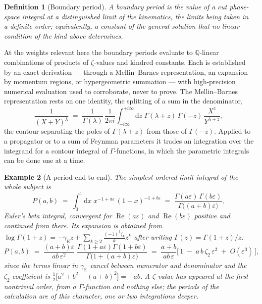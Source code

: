 \documentclass[11pt]{article}
\newcommand{\eps}{\varepsilon}
\newcommand{\dd}{\mathrm{d}}
\newcommand{\Q}{\mathbb{Q}}
\newtheorem{definition}{Definition}[section]
\newtheorem{example}[definition]{Example}
\begin{document}
\begin{definition}[Boundary period]
A \emph{boundary period} is the value of a cut phase-space integral
at a distinguished limit of the kinematics, the limits being taken in
a definite order; equivalently, a constant of the general solution
that no linear condition of the kind above determines.
\end{definition}

At the weights relevant here the boundary periods evaluate to
$\Q$-linear combinations of products of $\zeta$-values and kindred
constants.  Each
is established by an exact derivation --- through a Mellin--Barnes
representation, an expansion by momentum regions, or hypergeometric
summation --- with high-precision numerical evaluation used to
corroborate, never to prove.  The Mellin--Barnes representation
rests on one identity, the splitting of a sum in the denominator,
\begin{equation}
  \frac{1}{(X+Y)^{\lambda}}
  \;=\; \frac{1}{\Gamma(\lambda)}\,
  \frac{1}{2\pi i}\int_{-i\infty}^{+i\infty}\!\dd z\;
  \Gamma(\lambda + z)\,\Gamma(-z)\,
  \frac{X^{z}}{Y^{\lambda+z}} ,
  \label{eq:mb}
\end{equation}
the contour separating the poles of $\Gamma(\lambda+z)$ from those of
$\Gamma(-z)$.  Applied to a propagator or to a sum of Feynman
parameters it trades an integration over the integrand for a contour
integral of $\Gamma$-functions, in which the parametric integrals can
be done one at a time.

\begin{example}[A period end to end]
\label{ex:period}
The simplest ordered-limit integral of the whole subject is
\begin{equation}
  P(a,b) \;=\; \int_0^1 \dd x\;
  x^{-1+a\eps}\,(1-x)^{-1+b\eps}
  \;=\; \frac{\Gamma(a\eps)\,\Gamma(b\eps)}
             {\Gamma\big((a+b)\eps\big)} ,
\end{equation}
Euler's beta integral, convergent for $\operatorname{Re}(a\eps)$ and
$\operatorname{Re}(b\eps)$ positive and continued from there.  Its
expansion is obtained from
$\log\Gamma(1+z) = -\gamma_{\mathrm E} z + \sum_{k\ge2}
\frac{(-1)^k\zeta_k}{k}z^k$ after writing
$\Gamma(z) = \Gamma(1+z)/z$:
\begin{equation}
  P(a,b) \;=\; \frac{(a+b)\eps}{a b\,\eps^{2}}\;
  \frac{\Gamma(1+a\eps)\Gamma(1+b\eps)}{\Gamma\big(1+(a+b)\eps\big)}
  \;=\; \frac{a+b}{ab\,\eps}
  \Big[\,1 \;-\; a\,b\,\zeta_2\,\eps^{2} \;+\; O(\eps^{3})\,\Big] ,
\end{equation}
since the terms linear in $\gamma_{\mathrm E}$ cancel between
numerator and denominator and the $\zeta_2$ coefficient is
$\tfrac12\big[a^2+b^2-(a+b)^2\big] = -ab$.  A $\zeta$-value has
appeared at the first nontrivial order, from a $\Gamma$-function and
nothing else; the periods of the calculation are of this character,
one or two integrations deeper.
\end{example}
\end{document}
